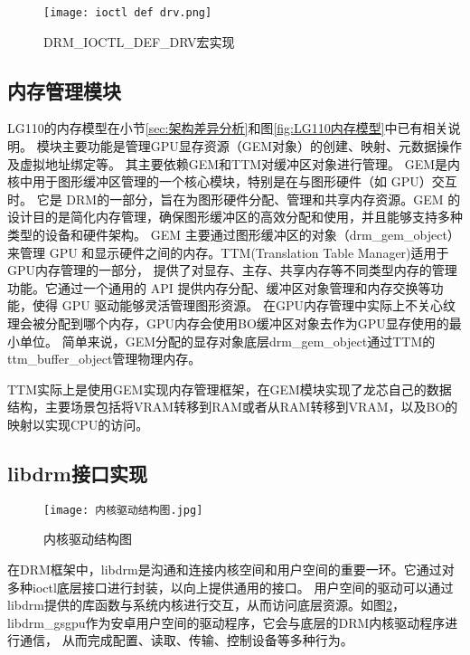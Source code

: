 \begin{figure}[h]
  \centering
  \texttt{[image: ioctl def drv.png]}
  \caption{DRM\_IOCTL\_DEF\_DRV宏实现}
  \label{fig:ioctl def drv}
\end{figure}

\subsection{内存管理模块}

LG110的内存模型在小节\ref{sec:架构差异分析}和图\ref{fig:LG110内存模型}中已有相关说明。
模块主要功能是管理GPU显存资源（GEM对象）的创建、映射、元数据操作及虚拟地址绑定等。
其主要依赖GEM和TTM对缓冲区对象进行管理。
GEM是内核中用于图形缓冲区管理的一个核心模块，特别是在与图形硬件（如 GPU）交互时。
它是 DRM的一部分，旨在为图形硬件分配、管理和共享内存资源。GEM 的设计目的是简化内存管理，确保图形缓冲区的高效分配和使用，并且能够支持多种类型的设备和硬件架构。
GEM 主要通过图形缓冲区的对象（drm\_gem\_object）来管理 GPU 和显示硬件之间的内存。TTM(Translation Table Manager)适用于GPU内存管理的一部分，
提供了对显存、主存、共享内存等不同类型内存的管理功能。它通过一个通用的 API 提供内存分配、缓冲区对象管理和内存交换等功能，使得 GPU 驱动能够灵活管理图形资源。
在GPU内存管理中实际上不关心纹理会被分配到哪个内存，GPU内存会使用BO缓冲区对象去作为GPU显存使用的最小单位。
简单来说，GEM分配的显存对象底层drm\_gem\_object通过TTM的ttm\_buffer\_object管理物理内存。

TTM实际上是使用GEM实现内存管理框架，在GEM模块实现了龙芯自己的数据结构，主要场景包括将VRAM转移到RAM或者从RAM转移到VRAM，以及BO的映射以实现CPU的访问。


\subsection{libdrm接口实现}

\begin{figure}[h]
  \centering
  \texttt{[image: 内核驱动结构图.jpg]}
  \caption{内核驱动结构图}
  \label{fig:内核驱动结构图}
\end{figure}

在DRM框架中，libdrm是沟通和连接内核空间和用户空间的重要一环。它通过对多种ioctl底层接口进行封装，以向上提供通用的接口。
用户空间的驱动可以通过libdrm提供的库函数与系统内核进行交互，从而访问底层资源。如图\ref{fig:内核驱动结构图}，
libdrm\_gsgpu作为安卓用户空间的驱动程序，它会与底层的DRM内核驱动程序进行通信，
从而完成配置、读取、传输、控制设备等多种行为。

